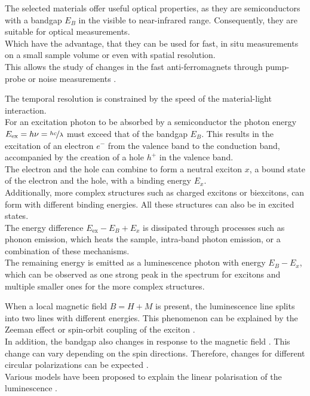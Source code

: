 \documentclass[
	oneside,
	parskip=half,
	a4paper,
]{scrbook}
\begin{document}
The selected materials offer useful optical properties, as they are semiconductors with a bandgap $E_B$ in the visible to near-infrared range.
Consequently, they are suitable for optical measurements.\\
Which have the advantage, that they can be used for fast, in situ measurements on a small sample volume or even with spatial resolution.\\
This allows the study of changes in the fast anti-ferromagnets through pump-probe or noise measurements \cite{AFM_review}.

The temporal resolution is constrained by the speed of the material-light interaction.\\
For an excitation photon to be absorbed by a semiconductor the photon energy $E_\text{ex} =h\nu= \nicefrac{hc}{\lambda}$ must exceed that of the bandgap $E_B$.
This results in the excitation of an electron $e^-$ from the valence band to the conduction band, accompanied by the creation of a hole $h^+$ in the valence band.\\
The electron and the hole can combine to form a neutral exciton $x$, a bound state of the electron and the hole, with a binding energy $E_x$.\\
Additionally, more complex structures such as charged excitons or biexcitons, can form with different binding energies.
All these structures can also be in excited states.\\
The energy difference $E_\text{ex}-E_B+E_x$ is dissipated through processes such as phonon emission, which heats the sample, intra-band photon emission, or a combination of these mechanisms.\\
The remaining energy is emitted as a luminescence photon with energy $E_B - E_x$, which can be observed as one strong peak in the spectrum for excitons and multiple smaller ones for the more complex structures.
\cite{MPX_first_principles,NiPS3_anisotropic,NiPS3_coherent,NiPS3_exciton}

When a local magnetic field $B=H+M$ is present, the luminescence line splits into two lines with different energies.
This phenomenon can be explained by the Zeeman effect or spin-orbit coupling of the exciton \cite{NiPS3_exciton}.\\
In addition, the bandgap also changes in response to the magnetic field \cite{MPS_magnetism}. 
This change can vary depending on the spin directions.
Therefore, changes for different circular polarizations can be expected \cite{MPX_first_principles}.\\
Various models have been proposed to explain the linear polarisation of the luminescence \cite{NiPS3_coherent, NiPS3_linear, NiPS3_exciton, NiPS3_anisotropic}.
\end{document}

